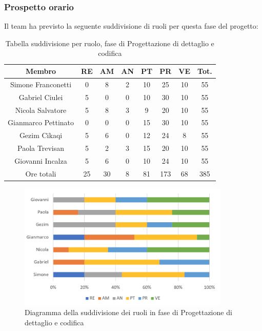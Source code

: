 \subsubsection{Prospetto orario}
Il team ha previsto la seguente suddivisione di ruoli per questa fase del progetto:
\begin{table}[h]
\caption{Tabella suddivisione per ruolo, fase di Progettazione di dettaglio e codifica}  
\begin{center}
\begin{tabular}{ |c|c|c|c|c|c|c|c|  }
 \hline
 Membro 		& RE 	& AM 	& AN 	& PT 	& PR 	& VE 	& Tot.\\
 \hline\hline
 Simone	Franconetti		& 0 		& 8		& 2 	& 10 	& 25 		& 10 		& 55\\
 Gabriel Ciulei		& 5 		& 0 		& 0 	& 10		& 30 		& 10 		& 55\\
 Nicola	Salvatore		& 5 		& 8 		& 3 	& 9 		& 20 		& 10 		& 55\\
 Gianmarco	Pettinato	& 0 		& 0 		& 0 	& 15 	& 30 		& 10 		& 55\\
 Gezim	Cikaqi		& 5 		& 6 		& 0 	& 12 	& 24 		& 8	 		& 55\\
 Paola	Trevisan		& 5 		& 2 		& 3 	& 15 	& 20 		& 10 		& 55\\
 Giovanni	Incalza	& 5 		& 6	 	& 0 	& 10 	& 24 		& 10  		& 55\\
 \hline\hline
 Ore totali		& 25		& 30		& 8 	& 81	 	& 173 	& 68 	& 385\\
  \hline
\end{tabular}
\end{center}
\end{table}
\begin{figure}[h!]
	\centering
	\includegraphics[width=0.9\textwidth]{res/img/hi33}
	\caption{Diagramma della suddivisione dei ruoli in fase di Progettazione di dettaglio e codifica}
\end{figure}

